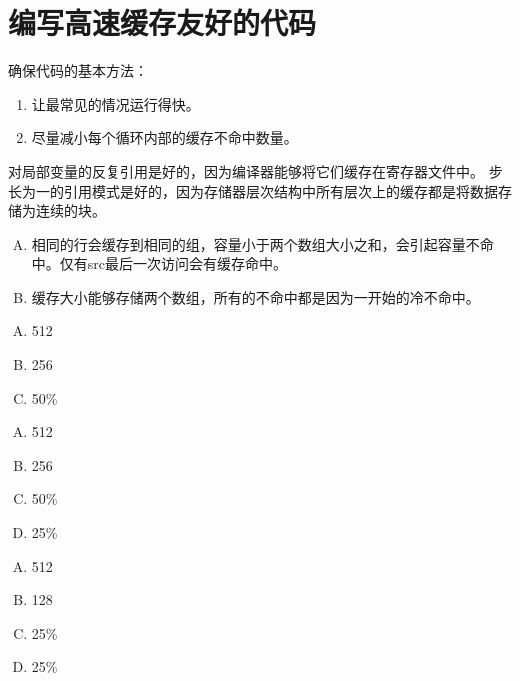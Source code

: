 
\section{编写高速缓存友好的代码}
{
    确保代码的基本方法：

    \begin{enumerate}
        \item 让最常见的情况运行得快。
        \item 尽量减小每个循环内部的缓存不命中数量。
    \end{enumerate}

    对局部变量的反复引用是好的，因为编译器能够将它们缓存在寄存器文件中。
    步长为一的引用模式是好的，因为存储器层次结构中所有层次上的缓存都是将数据存储为连续的块。

    \begin{practicec}
        \begin{enumerate}[A.]
            \item 相同的行会缓存到相同的组，容量小于两个数组大小之和，会引起容量不命中。仅有src最后一次访问会有缓存命中。
            \item 缓存大小能够存储两个数组，所有的不命中都是因为一开始的冷不命中。
        \end{enumerate}
    \end{practicec}

    \begin{practicec}
        \begin{enumerate}[A.]
            \item 512
            \item 256
            \item 50\%
        \end{enumerate}
    \end{practicec}

    \begin{practicec}
        \begin{enumerate}[A.]
            \item 512
            \item 256
            \item 50\%
            \item 25\%
        \end{enumerate}
    \end{practicec}

    \begin{practicec}
        \begin{enumerate}[A.]
            \item 512
            \item 128
            \item 25\%
            \item 25\%
        \end{enumerate}
    \end{practicec}
}
